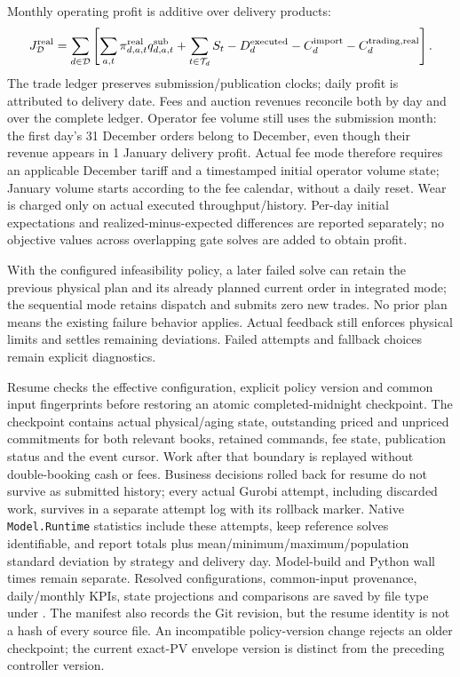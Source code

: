 \documentclass[11pt,a4paper]{article}
\begin{document}
Monthly operating profit is additive over delivery products:
\begin{equation}
 J_{\mathcal D}^{\rm real}=\sum_{d\in\mathcal D}\left[
   \sum_{a,t}\pi^{\rm real}_{d,a,t}q^{\rm sub}_{d,a,t}
   +\sum_{t\in\mathcal T_d}S_t
   -D_d^{\rm executed}-C_d^{\rm import}-C_d^{\rm trading,real}\right].
\end{equation}
The trade ledger preserves submission/publication clocks; daily profit is
attributed to delivery date. Fees and auction revenues reconcile both by day
and over the complete ledger. Operator fee volume still uses the submission
month: the first day's 31 December orders belong to December, even though
their revenue appears in 1 January delivery profit. Actual fee mode therefore
requires an applicable December tariff and a timestamped initial operator
volume state; January volume starts according to the fee calendar, without a
daily reset. Wear is charged only on actual executed throughput/history.
Per-day initial expectations and realized-minus-expected differences are
reported separately; no objective values across overlapping gate solves are
added to obtain profit.

With the configured infeasibility policy, a later failed solve can retain the
previous physical plan and its already planned current order in integrated
mode; the sequential mode retains dispatch and submits zero new trades. No
prior plan means the existing failure behavior applies. Actual feedback still
enforces physical limits and settles remaining deviations. Failed attempts
and fallback choices remain explicit diagnostics.

Resume checks the effective configuration, explicit policy version and common input
fingerprints before restoring an atomic completed-midnight checkpoint. The
checkpoint contains actual physical/aging state, outstanding priced and
unpriced commitments for both relevant books, retained commands, fee state,
publication status and the event cursor. Work after that boundary is replayed
without double-booking cash or fees. Business decisions rolled back for resume
do not survive as submitted history; every actual Gurobi attempt, including
discarded work, survives in a separate attempt log with its rollback marker.
Native \texttt{Model.Runtime} statistics include these attempts, keep reference
solves identifiable, and report totals plus mean/minimum/maximum/population
standard deviation by strategy and delivery day. Model-build and Python wall
times remain separate. Resolved configurations, common-input provenance,
daily/monthly KPIs, state projections and comparisons are saved by file type
under . The manifest
also records the Git revision, but the resume identity is not a hash of every
source file. An incompatible policy-version change rejects an older checkpoint;
the current exact-PV envelope version is distinct from the preceding controller
version.
\end{document}
